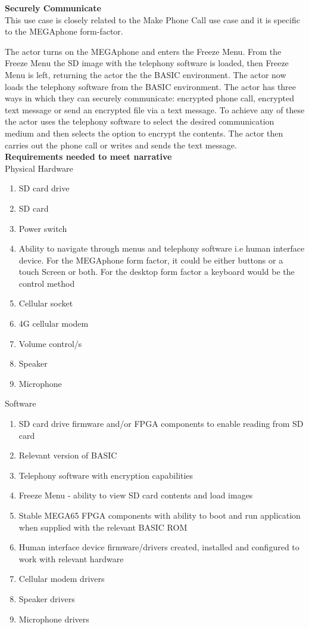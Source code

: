 \textbf{Securely Communicate}\\
This use case is closely related to the Make Phone Call use case and it is specific to the MEGAphone form-factor.

The actor turns on the MEGAphone and enters the Freeze Menu. From the Freeze Menu the SD image with the telephony software is loaded, then Freeze Menu is left, returning the actor the the BASIC environment. The actor now loads the telephony software from the BASIC environment. The actor has three ways in which they can securely communicate: encrypted phone call, encrypted text message or send an encrypted file via a text message. To achieve any of these the actor uses the telephony software to select the desired communication medium and then selects the option to encrypt the contents. The actor then carries out the phone call or writes and sends the text message. \\

\textbf{Requirements needed to meet narrative}\\
Physical Hardware
\begin{enumerate}
\item SD card drive
\item SD card
\item Power switch
\item Ability to navigate through menus and telephony software i.e human interface device. For the MEGAphone form factor, it could be either buttons or a touch Screen or both. For the desktop form factor a keyboard would be the control method
\item Cellular socket
\item 4G cellular modem
\item Volume control/s
\item Speaker
\item Microphone
\end{enumerate}

Software\\
\begin{enumerate}
\item SD card drive firmware and/or FPGA components to enable reading from SD card
\item Relevant version of BASIC 
\item Telephony software with encryption capabilities
\item Freeze Menu - ability to view SD card contents and load images
\item Stable MEGA65 FPGA components with ability to boot and run application when supplied with the relevant BASIC ROM
\item Human interface device firmware/drivers created, installed and configured to work with relevant hardware
\item Cellular modem drivers
\item Speaker drivers
\item Microphone drivers
\end{enumerate}

